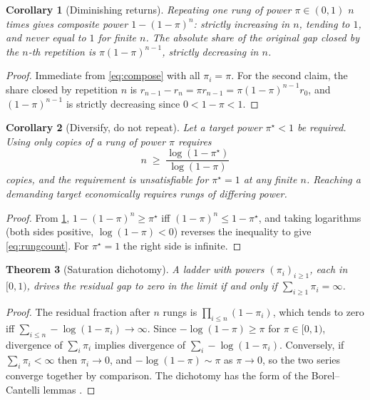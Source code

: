 \documentclass[11pt,twocolumn,a4paper]{article}
\theoremstyle{plain}
\newtheorem{theorem}{Theorem}[section]
\newtheorem{corollary}[theorem]{Corollary}
\theoremstyle{definition}
\theoremstyle{remark}
\newcommand{\pow}{\pi}
\newcommand{\gap}{r}
\begin{document}
\begin{corollary}[Diminishing returns]
\label{cor:diminishing}
Repeating one rung of power $\pow \in (0,1)$ $n$ times gives composite power
$1-(1-\pow)^n$: strictly increasing in $n$, tending to $1$, and never equal to
$1$ for finite $n$. The absolute share of the original gap closed by the $n$-th
repetition is $\pow(1-\pow)^{n-1}$, strictly decreasing in $n$.
\end{corollary}

\begin{proof}
Immediate from \cref{eq:compose} with all $\pow_i = \pow$. For the second claim,
the share closed by repetition $n$ is
$\gap_{n-1}-\gap_n = \pow\gap_{n-1} = \pow(1-\pow)^{n-1}\gap_0$, and
$(1-\pow)^{n-1}$ is strictly decreasing since $0 < 1-\pow < 1$.
\end{proof}

\begin{corollary}[Diversify, do not repeat]
\label{cor:diversify}
Let a target power $\pow^\star < 1$ be required. Using only copies of a rung of
power $\pow$ requires
\begin{equation}
n \;\geq\; \frac{\log(1-\pow^\star)}{\log(1-\pow)}
\label{eq:rungcount}
\end{equation}
copies, and the requirement is unsatisfiable for $\pow^\star = 1$ at any finite
$n$. Reaching a demanding target economically requires rungs of differing power.
\end{corollary}

\begin{proof}
From \cref{cor:diminishing}, $1-(1-\pow)^n \geq \pow^\star$ iff
$(1-\pow)^n \leq 1-\pow^\star$, and taking logarithms (both sides positive,
$\log(1-\pow) < 0$) reverses the inequality to give \cref{eq:rungcount}. For
$\pow^\star = 1$ the right side is infinite.
\end{proof}

\begin{theorem}[Saturation dichotomy]
\label{thm:saturation}
A ladder with powers $(\pow_i)_{i\geq1}$, each in $[0,1)$, drives the residual
gap to zero in the limit if and only if $\sum_{i\geq1}\pow_i = \infty$.
\end{theorem}

\begin{proof}
The residual fraction after $n$ rungs is $\prod_{i\leq n}(1-\pow_i)$, which
tends to zero iff $\sum_{i\leq n} -\log(1-\pow_i) \to \infty$. Since
$-\log(1-\pow) \geq \pow$ for $\pow\in[0,1)$, divergence of $\sum_i\pow_i$
implies divergence of $\sum_i -\log(1-\pow_i)$. Conversely, if
$\sum_i \pow_i < \infty$ then $\pow_i \to 0$, and $-\log(1-\pow) \sim \pow$ as
$\pow \to 0$, so the two series converge together by comparison. The dichotomy
has the form of the Borel--Cantelli lemmas
\citep{borel1909,cantelli1917,williams1991}.
\end{proof}
\end{document}
